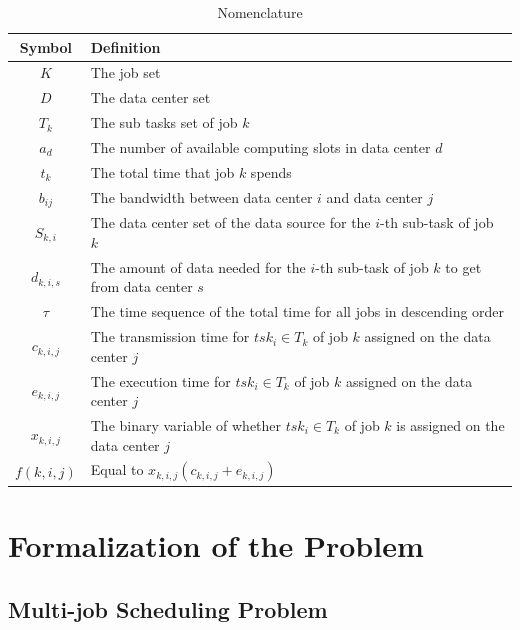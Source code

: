\documentclass{llncs}
\begin{document}
\begin{table}[H]
    \centering
    \caption{Nomenclature}
    \label{tab:Nomen}
    \begin{tabular}{c|p{14cm}}
\toprule
    	Symbol & Definition\\
\midrule
	$K$ & The job set\\
	$D$ & The data center set\\
	$T_k$ & The sub tasks set of job $ k $\\
	$a_d$ & The number of available computing slots in data center $ d $\\
	$t_k$ & The total time that job $ k $ spends\\
	$b_{ij}$ & The bandwidth between data center $ i $ and data center $ j $\\
	$S_{k,i}$ & The data center set of the data source for the $ i $-th sub-task of job $ k $\\
	$d_{k,i,s}$ & The amount of data needed for the $ i $-th sub-task of job $ k $ to get from data center $ s $\\
	$\tau$ & The time sequence of the total time for all jobs in descending order\\
	$c_{k,i,j}$ & The transmission time for $ tsk_{i} \in T_k $ of job $ k $ assigned on the data center $ j $\\
	$e_{k,i,j}$ & The execution time for $ tsk_{i} \in T_k $ of job $ k $ assigned on the data center $ j $\\
	$x_{k,i,j}$ & The binary variable of whether $ tsk_{i} \in T_k $ of job $ k $ is assigned on the data center $ j $\\
	$f(k,i,j)$ & Equal to $ x_{k,i,j}(c_{k,i,j} + e_{k,i,j}) $\\
	
\bottomrule   \end{tabular}
\end{table}

\section{Formalization of the Problem}

\subsection{Multi-job Scheduling Problem}
\end{document}
